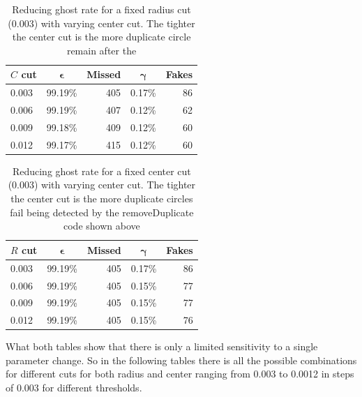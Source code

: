 \documentclass[11pt,twoside]{scrreprt}
\begin{document}
\label{ssub:cut_variation_for_a_fixed_threshold}
\begin{table}[htbp]
  \caption{Reducing ghost rate for a fixed radius cut (0.003) with varying center cut. The tighter the center cut is
  the more duplicate circle remain after the }
  \label{tab:cut_variation_1}
  \centering

  \begin{tabular}{lcrcr}
  \toprule
  \textbf{$C$ cut} & $\boldsymbol{\epsilon}$ & \textbf{Missed} & $\boldsymbol{\gamma}$ & \textbf{Fakes} \\
  \midrule
  0.003 & 99.19\% & 405 & 0.17\% & 86 \\
  0.006 & 99.19\% & 407 & 0.12\% & 62 \\
  0.009 & 99.18\% & 409 & 0.12\% & 60 \\
  0.012 & 99.17\% & 415 & 0.12\% & 60 \\
    \bottomrule
  \end{tabular}
\end{table}

\begin{table}[htbp]
  \caption{Reducing ghost rate for a fixed center cut (0.003) with varying center cut. The tighter the center cut is
  the more duplicate circles fail being detected by the removeDuplicate code shown above}
  \label{tab:cut_variation_2}
  \centering

  \begin{tabular}{lcrcr}
  \toprule
  \textbf{$R$ cut} & $\boldsymbol{\epsilon}$ & \textbf{Missed} & $\boldsymbol{\gamma}$ & \textbf{Fakes} \\
  \midrule
  0.003 & 99.19\% & 405 & 0.17\% & 86 \\
  0.006 & 99.19\% & 405 & 0.15\% & 77 \\
  0.009 & 99.19\% & 405 & 0.15\% & 77 \\
  0.012 & 99.19\% & 405 & 0.15\% & 76 \\
  \bottomrule
  \end{tabular}
\end{table}

What both tables show that there is only a limited sensitivity to a single parameter change. So in the following
tables there is all the possible combinations for different cuts for both radius and center ranging from 0.003 to
0.0012 in steps of $0.003$ for different thresholds. 
\end{document}
